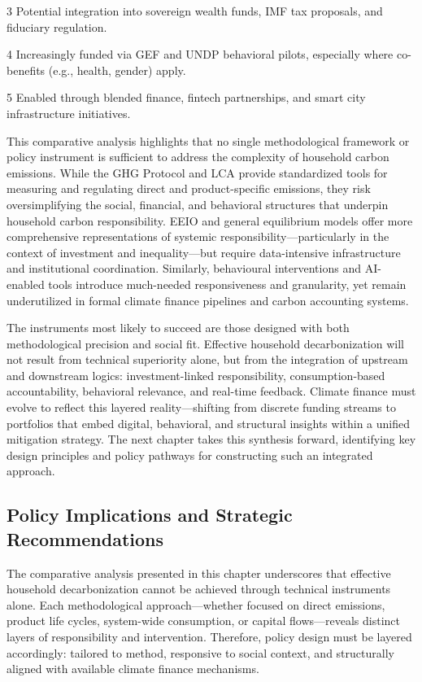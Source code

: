 \documentclass[12pt,a4paper]{article}%
\begin{document}
\begin{table}[h]
\begin{threeparttable}
\begin{tablenotes}
\item[3] Potential integration into sovereign wealth funds, IMF tax proposals, and fiduciary regulation.
\item[4] Increasingly funded via GEF and UNDP behavioral pilots, especially where co-benefits (e.g., health, gender) apply.
\item[5] Enabled through blended finance, fintech partnerships, and smart city infrastructure initiatives.
\end{tablenotes}
\end{threeparttable}
\end{table}

This comparative analysis highlights that no single methodological framework or policy instrument is sufficient to address the complexity of household carbon emissions. While the GHG Protocol and LCA provide standardized tools for measuring and regulating direct and product-specific emissions, they risk oversimplifying the social, financial, and behavioral structures that underpin household carbon responsibility. EEIO and general equilibrium models offer more comprehensive representations of systemic responsibility—particularly in the context of investment and inequality—but require data-intensive infrastructure and institutional coordination. Similarly, behavioural interventions and AI-enabled tools introduce much-needed responsiveness and granularity, yet remain underutilized in formal climate finance pipelines and carbon accounting systems.

The instruments most likely to succeed are those designed with both methodological precision and social fit. Effective household decarbonization will not result from technical superiority alone, but from the integration of upstream and downstream logics: investment-linked responsibility, consumption-based accountability, behavioral relevance, and real-time feedback. Climate finance must evolve to reflect this layered reality—shifting from discrete funding streams to portfolios that embed digital, behavioral, and structural insights within a unified mitigation strategy. The next chapter takes this synthesis forward, identifying key design principles and policy pathways for constructing such an integrated approach.

\subsection{Policy Implications and Strategic Recommendations}

The comparative analysis presented in this chapter underscores that effective household decarbonization cannot be achieved through technical instruments alone. Each methodological approach—whether focused on direct emissions, product life cycles, system-wide consumption, or capital flows—reveals distinct layers of responsibility and intervention. Therefore, policy design must be layered accordingly: tailored to method, responsive to social context, and structurally aligned with available climate finance mechanisms.
\end{document}
